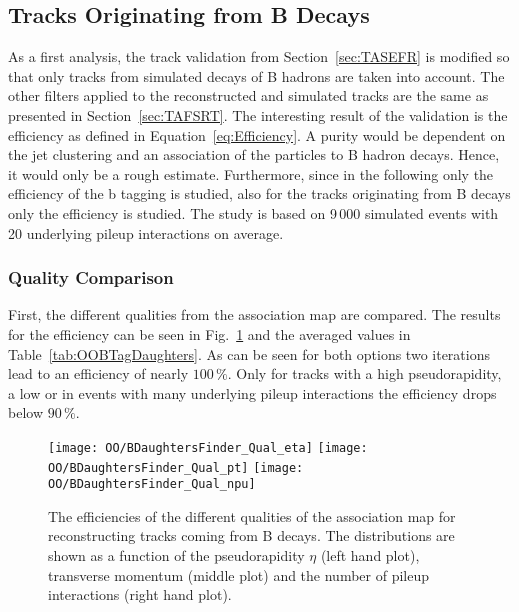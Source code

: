 \subsection{Tracks Originating from B Decays \label{sec:OOBTagDaughters}}

As a first analysis, the track validation from Section~\ref{sec:TASEFR} is modified so that only tracks from simulated decays of B hadrons are taken into account. The other filters applied to the reconstructed and simulated tracks are the same as presented in Section~\ref{sec:TAFSRT}. The interesting result of the validation is the efficiency as defined in Equation~\ref{eq:Efficiency}. A purity would be dependent on the jet clustering and an association of the particles to B hadron decays. Hence, it would only be a rough estimate. Furthermore, since in the following only the efficiency of the b tagging is studied, also for the tracks originating from B decays only the efficiency is studied. The study is based on 9\,000 simulated \ttbar events with 20 underlying pileup interactions on average. 

\subsubsection{Quality Comparison \label{sec:OOBTagDaughtersQual}}

First, the different qualities from the association map are compared. The results for the efficiency can be seen in Fig.~\ref{plot:OOBTagDaughtersQual} and the averaged values in Table~\ref{tab:OOBTagDaughters}. As can be seen for both options two iterations lead to an efficiency of nearly $100\,\%$. Only for tracks with a high pseudorapidity, a low \pt or in events with many underlying pileup interactions the efficiency drops below $90\,\%$. 

\begin{figure}[h!t]
  \centering
  \texttt{[image: OO/BDaughtersFinder\_Qual\_eta]}
  \texttt{[image: OO/BDaughtersFinder\_Qual\_pt]}
  \texttt{[image: OO/BDaughtersFinder\_Qual\_npu]}
  \caption[Efficiencies of the different qualities of the association map for reconstructing tracks from B decays]{The efficiencies of the different qualities of the association map for reconstructing tracks coming from B decays. The distributions are shown as a function of the pseudorapidity $\eta$ (left hand plot), transverse momentum (middle plot) and the number of pileup interactions (right hand plot). \label{plot:OOBTagDaughtersQual}}
\end{figure}

